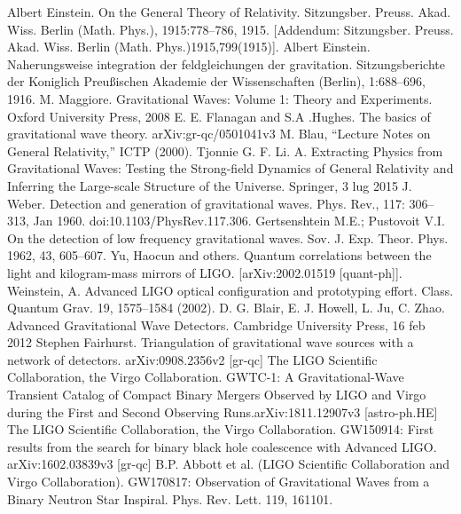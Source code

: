 \documentclass[binding=0.6cm, LaM]{sapthesis}
\begin{document}
\backmatter
\cleardoublepage


\begin{thebibliography}{500}

	 Albert Einstein. On the General Theory of Relativity. Sitzungsber. Preuss. Akad. Wiss. Berlin (Math. Phys.), 1915:778–786, 1915. [Addendum: Sitzungsber. Preuss. Akad. Wiss. Berlin (Math. Phys.)1915,799(1915)]. 
	 Albert Einstein. Naherungsweise integration der feldgleichungen der gravitation. Sitzungsberichte der Koniglich Preu{\ss}ischen Akademie der Wissenschaften (Berlin), 1:688–696, 1916. 
	 M. Maggiore. Gravitational Waves: Volume 1: Theory and Experiments. Oxford University Press, 2008
	 E. E. Flanagan and S.A .Hughes. The basics of gravitational wave theory. arXiv:gr-qc/0501041v3
	 M. Blau, “Lecture Notes on General Relativity,” ICTP (2000). 
	 Tjonnie G. F. Li. A. Extracting Physics from Gravitational Waves: Testing the Strong-field Dynamics of General Relativity and Inferring the Large-scale Structure of the Universe. Springer, 3 lug 2015	
	 J. Weber. Detection and generation of gravitational waves. Phys. Rev., 117: 306–313, Jan 1960. doi:10.1103/PhysRev.117.306. 
	 Gertsenshtein M.E.; Pustovoit V.I. On the detection of low frequency gravitational waves. Sov. J. Exp. Theor. Phys. 1962, 43, 605–607. 
	 Yu, Haocun and others. Quantum correlations between the light and kilogram-mass mirrors of LIGO. [arXiv:2002.01519 [quant-ph]].
	 Weinstein, A. Advanced LIGO optical configuration and prototyping effort. Class. Quantum Grav. 19, 1575–1584 (2002).
	 D. G. Blair, E. J. Howell, L. Ju, C. Zhao. Advanced Gravitational Wave Detectors. Cambridge University Press, 16 feb 2012 
	 Stephen Fairhurst. Triangulation of gravitational wave sources with a network of detectors. arXiv:0908.2356v2 [gr-qc]
	 The LIGO Scientific Collaboration, the Virgo Collaboration. GWTC-1: A Gravitational-Wave Transient Catalog of Compact Binary Mergers Observed by LIGO and Virgo during the First and Second Observing Runs.arXiv:1811.12907v3 [astro-ph.HE]
	 The LIGO Scientific Collaboration, the Virgo Collaboration. GW150914: First results from the search for binary black hole coalescence with Advanced LIGO. arXiv:1602.03839v3 [gr-qc]
         B.P. Abbott et al. (LIGO Scientific Collaboration and Virgo Collaboration). GW170817: Observation of Gravitational Waves from a Binary Neutron Star Inspiral. Phys. Rev. Lett. 119, 161101.	

\end{thebibliography}
\end{document}
